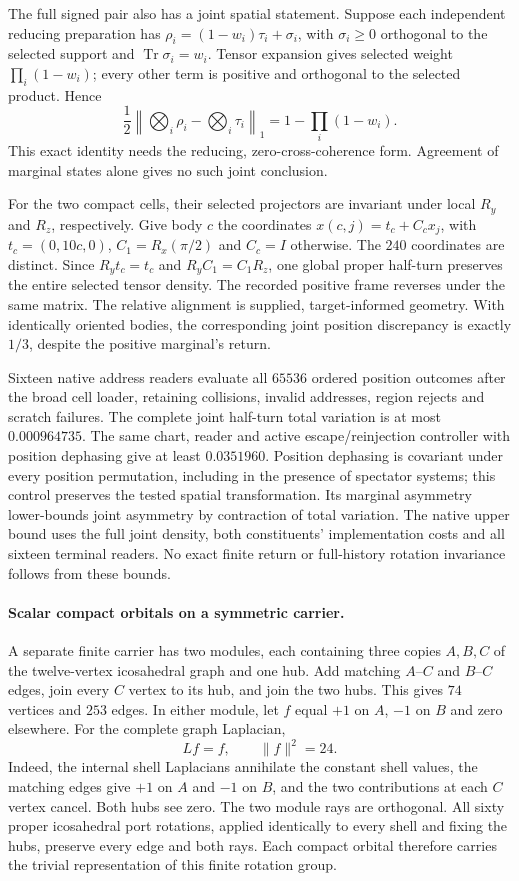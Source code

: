 The full signed pair also has a joint spatial statement. Suppose each
independent reducing preparation has
$\rho_i=(1-w_i)\tau_i+\sigma_i$, with $\sigma_i\geq0$ orthogonal to
the selected support and $\operatorname{Tr}\sigma_i=w_i$. Tensor
expansion gives selected weight $\prod_i(1-w_i)$; every other term is
positive and orthogonal to the selected product. Hence
\[
 \frac12\left\|\bigotimes_i\rho_i-\bigotimes_i\tau_i\right\|_1
       =1-\prod_i(1-w_i).
\]
This exact identity needs the reducing, zero-cross-coherence form.
Agreement of marginal states alone gives no such joint conclusion.

For the two compact cells, their selected projectors are invariant under
local $R_y$ and $R_z$, respectively. Give body $c$ the coordinates
$x(c,j)=t_c+C_cx_j$, with $t_c=(0,10c,0)$,
$C_1=R_x(\pi/2)$ and $C_c=I$ otherwise. The $240$ coordinates are
distinct. Since $R_yt_c=t_c$ and $R_yC_1=C_1R_z$, one global proper
half-turn preserves the entire selected tensor density. The recorded
positive frame reverses under the same matrix. The relative alignment
is supplied, target-informed geometry. With identically oriented bodies,
the corresponding joint position discrepancy is exactly $1/3$, despite
the positive marginal's return.

Sixteen native address readers evaluate all $65536$ ordered position
outcomes after the broad cell loader, retaining collisions, invalid
addresses, region rejects and scratch failures. The complete joint
half-turn total variation is at most $0.000964735$. The same chart,
reader and active escape/reinjection controller with position dephasing
give at least $0.0351960$. Position dephasing is covariant under every
position permutation, including in the presence of spectator systems;
this control preserves the tested spatial transformation. Its marginal
asymmetry lower-bounds joint asymmetry by contraction of total variation.
The native upper bound uses the full joint density, both constituents'
implementation costs and all sixteen terminal readers. No exact finite
return or full-history rotation invariance follows from these bounds.

\paragraph{Scalar compact orbitals on a symmetric carrier.}
A separate finite carrier has two modules, each containing three copies
$A,B,C$ of the twelve-vertex icosahedral graph and one hub. Add matching
$A$--$C$ and $B$--$C$ edges, join every $C$ vertex to its hub, and join
the two hubs. This gives $74$ vertices and $253$ edges. In either module,
let $f$ equal $+1$ on $A$, $-1$ on $B$ and zero elsewhere. For the
complete graph Laplacian,
\[
 Lf=f,\qquad \|f\|^2=24.
\]
Indeed, the internal shell Laplacians annihilate the constant shell
values, the matching edges give $+1$ on $A$ and $-1$ on $B$, and the
two contributions at each $C$ vertex cancel. Both hubs see zero.
The two module rays are orthogonal. All sixty proper icosahedral port
rotations, applied identically to every shell and fixing the hubs,
preserve every edge and both rays. Each compact orbital therefore
carries the trivial representation of this finite rotation group.


